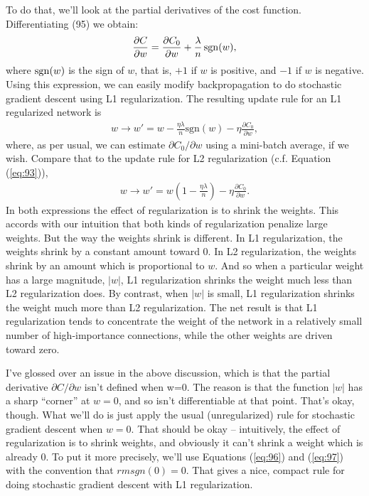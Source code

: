 \documentclass[a4paper,twoside,10pt]{book}
\begin{document}
To do that, we'll look at the partial derivatives of the cost function. Differentiating (95) we obtain:
\begin{eqnarray}
\frac{\partial C}{\partial w} = \frac{\partial C_0}{\partial w} + \frac{\lambda}{n} \, {\rm sgn}(w),\label{eq:96}
\end{eqnarray}
where ${\rm sgn}(w)$ is the sign of $w$, that is, $+1$ if $w$ is positive, and $-1$ if $w$ is negative. Using this expression, we can easily modify backpropagation to do stochastic gradient descent using L1 regularization. The resulting update rule for an L1 regularized network is
\begin{eqnarray}  w \to w' = w-\frac{\eta \lambda}{n} \mbox{sgn}(w) - \eta \frac{\partial C_0}{\partial w}, \label{eq:97}\end{eqnarray}
where, as per usual, we can estimate $\partial{}C_0/\partial{}w$ using a mini-batch average, if we wish. Compare that to the update rule for L2 regularization (c.f. Equation (\ref{eq:93})),
\begin{eqnarray}
w \to w' = w\left(1 - \frac{\eta \lambda}{n} \right) - \eta \frac{\partial C_0}{\partial w}.
\label{eq:98}\end{eqnarray}
In both expressions the effect of regularization is to shrink the weights. This accords with our intuition that both kinds of regularization penalize large weights. But the way the weights shrink is different. In L1 regularization, the weights shrink by a constant amount toward 0. In L2 regularization, the weights shrink by an amount which is proportional to $w$. And so when a particular weight has a large magnitude, $|w|$, L1 regularization shrinks the weight much less than L2 regularization does. By contrast, when $|w|$ is small, L1 regularization shrinks the weight much more than L2 regularization. The net result is that L1 regularization tends to concentrate the weight of the network in a relatively small number of high-importance connections, while the other weights are driven toward zero.

I've glossed over an issue in the above discussion, which is that the partial derivative $\partial{}C/\partial{}w$ isn't defined when w=0. The reason is that the function $|w|$ has a sharp ``corner'' at $w=0$, and so isn't differentiable at that point. That's okay, though. What we'll do is just apply the usual (unregularized) rule for stochastic gradient descent when $w=0$. That should be okay -- intuitively, the effect of regularization is to shrink weights, and obviously it can't shrink a weight which is already 0. To put it more precisely, we'll use Equations (\ref{eq:96}) and (\ref{eq:97}) with the convention that ${rm sgn}(0)=0$. That gives a nice, compact rule for doing stochastic gradient descent with L1 regularization.
\end{document}
